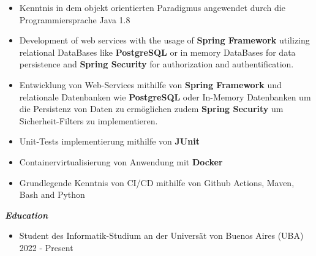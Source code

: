 \documentclass{article}
\begin{document}
\fontsize{9pt}{0pt}
\noindent
\begin{itemize}
    \item Kenntnis in dem objekt orientierten Paradigmus angewendet durch die Programmiersprache Java 1.8
    \item Development of web services with the usage of \textbf{Spring Framework} utilizing relational DataBases like \textbf{PostgreSQL} or in memory DataBases for data persistence and \textbf{Spring Security} for authorization and authentification.
    \item Entwicklung von Web-Services mithilfe von \textbf{Spring Framework} und relationale Datenbanken wie \textbf{PostgreSQL} oder In-Memory Datenbanken um die Persistenz von Daten zu ermöglichen zudem \textbf{Spring Security} um Sicherheit-Filters zu implementieren.
    \item Unit-Tests implementierung mithilfe von \textbf{JUnit}
    \item Containervirtualisierung von Anwendung mit \textbf{Docker}
    \item Grundlegende Kenntnis von CI/CD mithilfe von Github Actions, Maven, Bash and Python
\end{itemize}


\vspace{4mm}
\fontsize{12pt}{0pt}
\begin{center}
    \textit{\textbf{Education}}
\end{center}

\begin{itemize}
\item Student des Informatik-Studium an der Universät von Buenos Aires (UBA) \hfil 2022 - Present

\end{itemize}
\end{document}
